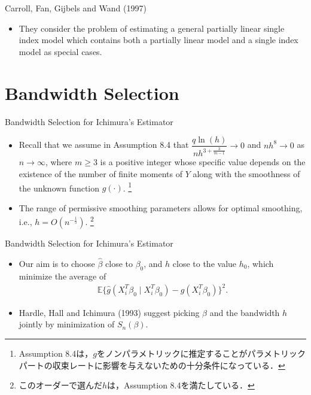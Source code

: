 \documentclass[xcolor=svgnames,dvipdfmx,cjk]{beamer}
\theoremstyle{example}
\def\E{\mathbb{E}}
\begin{document}
\begin{frame}{Carroll, Fan, Gijbels and Wand (1997)}
\begin{itemize}
  \item They consider the problem of estimating a general partially linear single index model 
        which contains both a partially linear model and a single index model as special cases.
\end{itemize}
\end{frame}


\section{Bandwidth Selection}
  
\begin{frame}{Bandwidth Selection for Ichimura's Estimator}
  \begin{itemize}
    \item Recall that we assume in Assumption 8.4 that 
          $\dfrac{q \ln(h)}{nh^{3 + \frac{3}{m-1}}} \to 0$ and 
          $ nh^8 \to 0$ as $n \to \infty$, 
          where $m \geq 3$ is a positive integer 
          whose specific value depends on the existence of the number of finite moments of $Y$ 
          along with the smoothness of the unknown function $g(\cdot)$.
          \footnote{Assumption 8.4は，$g$をノンパラメトリックに推定することがパラメトリックパートの収束レートに影響を与えないための十分条件になっている．}
    \item The range of permissive smoothing parameters allows for optimal smoothing, i.e., 
          $h=O(n^{-\frac{1}{5}})$.
          \footnote{このオーダーで選んだ$h$は，Assumption 8.4を満たしている．}
  \end{itemize}
\end{frame}

\begin{frame}{Bandwidth Selection for Ichimura's Estimator}
  \begin{itemize}
    \item Our aim is to choose $\hat{\beta}$ close to $\beta_0$, 
          and $h$ close to the value $h_0$, 
          which minimize the average of 
          \begin{align*}
            \E\{ \hat{g}(X_i^{T}\beta_0 \mid X_i^{T}\beta_0) - g(X_i^{T}\beta_0) \}^2.
          \end{align*}
    \item Hardle, Hall and Ichimura (1993) suggest 
          picking $\beta$ and the bandwidth $h$ jointly
          by minimization of $S_n(\beta)$.
  \end{itemize}    
\end{frame}
  
\end{document}
